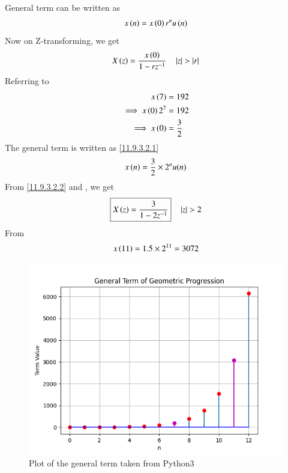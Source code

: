 \documentclass[journal,12pt,twocolumn]{IEEEtran}
\theoremstyle{remark}
\begin{document}
General term can be written as 
\begin{align}
    x\brak{n}=x\brak{0}r^{n}u\brak{n}\label{11.9.3.2.1}
\end{align}
Now on Z-transforming, we get
\begin{align}
    X\brak{z}=\frac{x\brak{0}}{1-rz^{-1}}\label{11.9.3.2.2} \quad   \abs{z}>\abs{r}
\end{align}
Referring to 
\begin{align}
         x\brak{7}&=192\\
\implies x\brak{0}2^{7}&=192\\
\implies x\brak{0}&=\frac{3}{2}
\end{align}
The general term is written as \eqref{11.9.3.2.1}
\begin{align}
    x\brak{n}=\frac{3}{2}\times2^{n}u(n)
\end{align}
From \eqref{11.9.3.2.2} and , we get
\begin{align}
   \boxed{X\brak{z}=\frac{3}{1-2z^{-1}}}\quad   \abs{z}>2
\end{align}
From  
\begin{align}
x\brak{11} = 1.5\times2^{11} = 3072
\end{align}
\begin{figure}[h]
\renewcommand\thefigure{1} 
    \centering
    \includegraphics[width=1.0\columnwidth]{ncert-maths/11/9/3/2/figs/Fig_3.png}
    \caption{Plot of the general term taken from Python3}
    \label{fig:1}
\end{figure}
\end{document}
